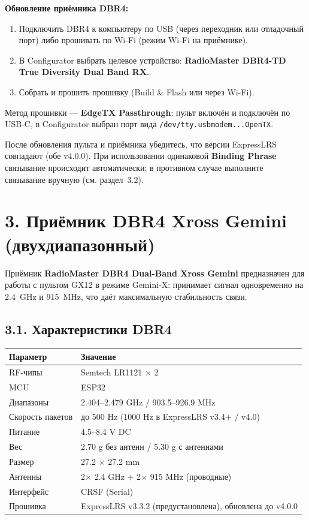 \documentclass[a4paper,11pt]{article}
\begin{document}
\textbf{Обновление приёмника DBR4:}
\begin{enumerate}[nosep]
  \item Подключить DBR4 к компьютеру по USB (через переходник или отладочный порт) либо прошивать по Wi-Fi (режим Wi-Fi на приёмнике).
  \item В Configurator выбрать целевое устройство: \textbf{RadioMaster DBR4-TD True Diversity Dual Band RX}.
  \item Собрать и прошить прошивку (Build \& Flash или через Wi-Fi).
\end{enumerate}

Метод прошивки --- \textbf{EdgeTX Passthrough}: пульт включён и подключён по USB-C, в Configurator выбран порт вида \texttt{/dev/tty.usbmodem...OpenTX}.

После обновления пульта и приёмника убедитесь, что версии ExpressLRS совпадают (обе v4.0.0). При использовании одинаковой \textbf{Binding Phrase} связывание происходит автоматически; в противном случае выполните связывание вручную (см. раздел~3.2).

\section{3. Приёмник DBR4 Xross Gemini (двухдиапазонный)}

Приёмник \textbf{RadioMaster DBR4 Dual-Band Xross Gemini} предназначен для работы с пультом GX12 в режиме Gemini-X: принимает сигнал одновременно на 2.4~GHz и 915~MHz, что даёт максимальную стабильность связи.

\subsection{3.1. Характеристики DBR4}

\begin{longtable}{ll}
  \toprule
  \textbf{Параметр} & \textbf{Значение} \\
  \midrule
  RF-чипы          & Semtech LR1121 $\times$ 2 \\
  MCU              & ESP32 \\
  Диапазоны        & 2.404--2.479 GHz / 903.5--926.9 MHz \\
  Скорость пакетов & до 500 Hz (1000 Hz в ExpressLRS v3.4+ / v4.0) \\
  Питание          & 4.5--8.4 V DC \\
  Вес              & 2.70 g без антенн / 5.30 g с антеннами \\
  Размер           & 27.2 $\times$ 27.2 mm \\
  Антенны          & 2$\times$ 2.4 GHz + 2$\times$ 915 MHz (проводные) \\
  Интерфейс        & CRSF (Serial) \\
  Прошивка         & ExpressLRS v3.3.2 (предустановлена), обновлена до v4.0.0 \\
  \bottomrule
\end{longtable}
\end{document}
